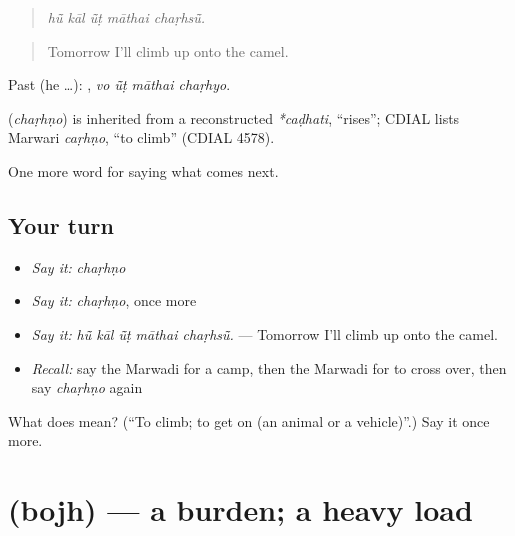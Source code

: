 \begin{quote}
    
\end{quote}

\begin{quote}
\emph{hū̃ kāl ū̃ṭ māthai chaṛhsū̃.}
\end{quote}

\begin{quote}
Tomorrow I'll climb up onto the camel.
\end{quote}

Past (he …):    , \emph{vo ū̃ṭ māthai chaṛhyo}.

\begin{cousinweb}
\textbf{} (\emph{chaṛhṇo}) is inherited from a reconstructed \emph{*caḍhati}, \textquotedblleft{}rises\textquotedblright{}; CDIAL lists Marwari \emph{caṛhṇo}, \textquotedblleft{}to climb\textquotedblright{} (CDIAL 4578).
\end{cousinweb}

\begin{grammarlens}[title={What you've built}]
One more word for saying what comes next.
\end{grammarlens}

\subsection*{Your turn}
\begin{itemize}
\raggedright
  \item \emph{Say it:} \emph{chaṛhṇo}
  \item \emph{Say it:} \emph{chaṛhṇo}, once more
  \item \emph{Say it:} \emph{hū̃ kāl ū̃ṭ māthai chaṛhsū̃.} — Tomorrow I'll climb up onto the camel.
  \item \emph{Recall:} say the Marwadi for a camp, then the Marwadi for to cross over, then say \emph{chaṛhṇo} again
\end{itemize}

\begin{tcolorbox}[breakable,colback=teal!4,colframe=teal!35!black,title={Before you move on}]
What does  mean? (\textquotedblleft{}To climb; to get on (an animal or a vehicle)\textquotedblright{}.) Say it once more.
\end{tcolorbox}
\section[\texorpdfstring{\mw{बोझ} (bojh)}{बोझ (bojh)}]{ (bojh) — a burden; a heavy load}

